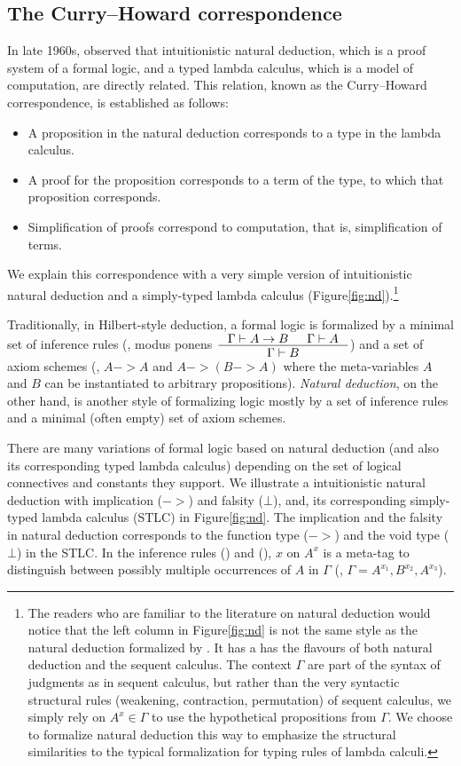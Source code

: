 \subsection*{The Curry--Howard correspondence}
In late 1960s, \citet{Howard69} observed that intuitionistic natural deduction,
which is a proof system of a formal logic, and a typed lambda calculus,
which is a model of computation, are directly related. This relation,
known as the Curry--Howard correspondence, is established as follows:
\begin{itemize}
\item A proposition in the natural deduction corresponds to
	a type in the lambda calculus.
\item A proof for the proposition corresponds to
	a term of the type, to which that proposition corresponds.
\item Simplification of proofs correspond to computation,
	that is, simplification of terms.
\end{itemize}
We explain this correspondence with a very simple
version of intuitionistic natural deduction and
a simply-typed lambda calculus (Figure\;\ref{fig:nd}).\footnote{
	The readers who are familiar to the literature on natural deduction
	would notice that the left column in Figure\;\ref{fig:nd} is not
	the same style as the natural deduction formalized by
	\citet{Gentzen35,Gentzen69}. It has a has the flavours of
	both natural deduction and the sequent calculus. The context $\Gamma$
	are part of the syntax of judgments as in sequent calculus,
	but rather than the very syntactic structural rules (weakening,
	contraction, permutation) of sequent calculus, we simply rely on
	$A^x \in \Gamma$ to use the hypothetical propositions from $\Gamma$.
	We choose to formalize natural deduction this way to emphasize
	the structural similarities to the typical formalization
	for typing rules of lambda calculi.}

Traditionally, in Hilbert-style deduction, a formal logic is formalized
by a minimal set of inference rules (\eg, modus ponens
$\inference{\Gamma |- A -> B & \Gamma |- A}{\Gamma |- B}$)
and a set of axiom schemes (\eg, $A -> A$ and $A -> (B -> A)$ where
the meta-variables $A$ and $B$ can be instantiated to arbitrary propositions).
\emph{Natural deduction}, on the other hand, is another style of
formalizing logic mostly by a set of inference rules and a minimal
(often empty) set of axiom schemes.

There are many variations of formal logic based on natural deduction
(and also its corresponding typed lambda calculus) depending on
the set of logical connectives and constants they support.
We illustrate a intuitionistic natural deduction with implication ($->$) and
falsity ($\bot$), and, its corresponding simply-typed lambda calculus (STLC)
in Figure\;\ref{fig:nd}. The implication and the falsity in natural deduction
corresponds to the function type ($->$) and the void type ($\bot$) in the STLC.
In the inference rules () and (),
$x$ on $A^x$ is a meta-tag to distinguish between possibly multiple
occurrences of $A$ in $\Gamma$ (\eg, $\Gamma = A^{x_1},B^{x_2},A^{x_3}$).


